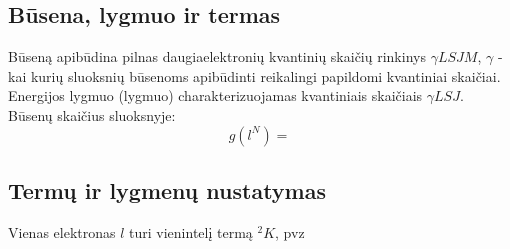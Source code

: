 \subsection*{Būsena, lygmuo ir termas}
Būseną apibūdina pilnas daugiaelektronių kvantinių skaičių rinkinys $\gamma LSJM$, $\gamma$ - kai kurių sluoksnių būsenoms apibūdinti reikalingi papildomi kvantiniai skaičiai. Energijos lygmuo (lygmuo) charakterizuojamas kvantiniais skaičiais $\gamma LSJ$. Būsenų skaičius sluoksnyje:
\begin{equation*}
    g(l^N) = 
\end{equation*}

\subsection*{Termų ir lygmenų nustatymas}
Vienas elektronas $l$ turi vienintelį termą ${}^2K$, pvz